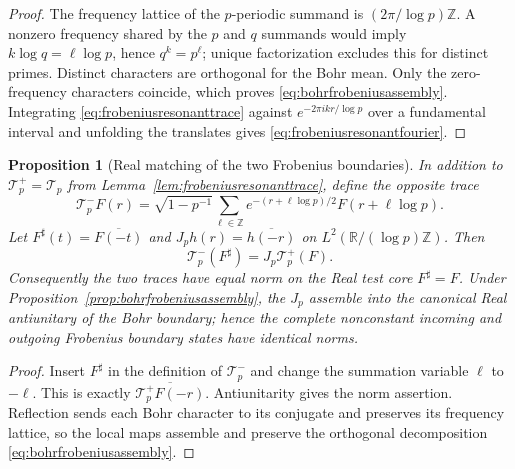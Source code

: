 \documentclass[11pt]{amsart}
\newtheorem{proposition}[theorem]{Proposition}
\theoremstyle{definition}
\theoremstyle{remark}
\begin{document}
\begin{proof}
The frequency lattice of the $p$-periodic summand is
$(2\pi/\log p)\mathbb Z$.  A nonzero frequency shared by the $p$ and $q$
summands would imply $k\log q=\ell\log p$, hence $q^k=p^\ell$; unique
factorization excludes this for distinct primes.  Distinct characters are
orthogonal for the Bohr mean.  Only the zero-frequency characters coincide,
which proves \eqref{eq:bohrfrobeniusassembly}.  Integrating
\eqref{eq:frobeniusresonanttrace} against
$e^{-2\pi ikr/\log p}$ over a fundamental interval and unfolding the
translates gives \eqref{eq:frobeniusresonantfourier}.
\end{proof}

\begin{proposition}[Real matching of the two Frobenius boundaries]
\label{prop:realfrobeniusboundary}
In addition to $\mathcal T_p^+=\mathcal T_p$ from
Lemma~\ref{lem:frobeniusresonanttrace}, define the opposite trace
\[
 \mathcal T_p^-F(r)=\sqrt{1-p^{-1}}
   \sum_{\ell\in\mathbb Z}e^{-(r+\ell\log p)/2}
       F(r+\ell\log p).
\]
Let $F^\sharp(t)=\overline{F(-t)}$ and
$J_ph(r)=\overline{h(-r)}$ on
$L^2(\mathbb R/(\log p)\mathbb Z)$.  Then
\begin{equation}\label{eq:realfrobeniusboundary}
 \mathcal T_p^-(F^\sharp)=J_p\mathcal T_p^+(F).
\end{equation}
Consequently the two traces have equal norm on the Real test core
$F^\sharp=F$.  Under Proposition~\ref{prop:bohrfrobeniusassembly}, the
$J_p$ assemble into the canonical Real antiunitary of the Bohr boundary;
hence the complete nonconstant incoming and outgoing Frobenius boundary
states have identical norms.
\end{proposition}

\begin{proof}
Insert $F^\sharp$ in the definition of $\mathcal T_p^-$ and change the
summation variable $\ell$ to $-\ell$.  This is exactly
$\overline{\mathcal T_p^+F(-r)}$.  Antiunitarity gives the norm assertion.
Reflection sends each Bohr character to its conjugate and preserves its
frequency lattice, so the local maps assemble and preserve the orthogonal
decomposition \eqref{eq:bohrfrobeniusassembly}.
\end{proof}
\end{document}
